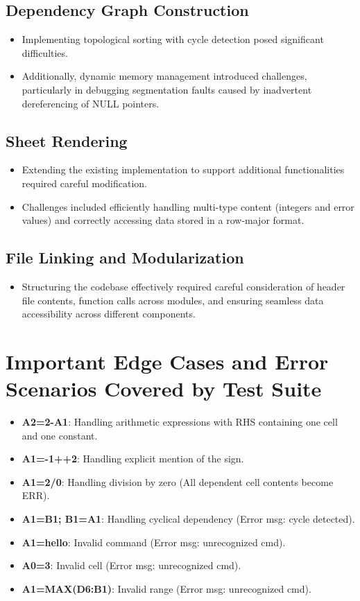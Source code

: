 \documentclass{article}
\begin{document}
\subsection{Dependency Graph Construction}
\begin{itemize}
    \item Implementing topological sorting with cycle detection posed significant difficulties.
    \item Additionally, dynamic memory management introduced challenges, particularly in debugging segmentation faults caused by inadvertent dereferencing of NULL pointers.
\end{itemize}

\subsection{Sheet Rendering}
\begin{itemize}
    \item Extending the existing implementation to support additional functionalities required careful modification.
    \item Challenges included efficiently handling multi-type content (integers and error values) and correctly accessing data stored in a row-major format.
\end{itemize}

\subsection{File Linking and Modularization}
\begin{itemize}
    \item Structuring the codebase effectively required careful consideration of header file contents, function calls across modules, and ensuring seamless data accessibility across different components.
\end{itemize}

\section{Important Edge Cases and Error Scenarios Covered by Test Suite}

\begin{itemize}
    \item \textbf{A2=2-A1}: Handling arithmetic expressions with RHS containing one cell and one constant.
    \item \textbf{A1=-1++2}: Handling explicit mention of the sign.
    \item \textbf{A1=2/0}: Handling division by zero (All dependent cell contents become ERR).
    \item \textbf{A1=B1; B1=A1}: Handling cyclical dependency (Error msg: cycle detected).
    \item \textbf{A1=hello}: Invalid command (Error msg: unrecognized cmd).
    \item \textbf{A0=3}: Invalid cell (Error msg: unrecognized cmd).
    \item \textbf{A1=MAX(D6:B1)}: Invalid range (Error msg: unrecognized cmd).
\end{itemize}
\end{document}
